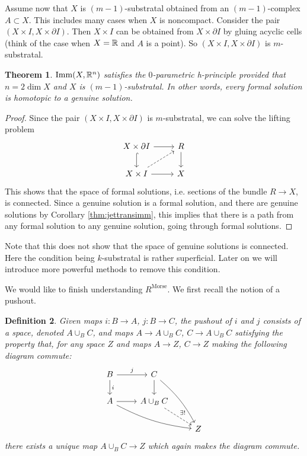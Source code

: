 \documentclass{article}
\newtheorem{theorem}{Theorem}[section]
\newtheorem{definition}[theorem]{Definition}
\newtheorem{proposed work}[theorem]{Proposed Work}
\theoremstyle{definition}
\DeclareMathOperator{\Imm}{Imm}
\DeclareMathOperator{\Morse}{Morse}
\begin{document}
Assume now that $X$ is $(m-1)$-substratal obtained from an $(m-1)$-complex $A \subset X$. This includes many cases when $X$ is noncompact. Consider the pair $(X\times I, X\times \partial I)$. Then $X\times I$ can be obtained from $X\times\partial I$ by gluing acyclic cells (think of the case when $X=\mathbb R$ and $A$ is a point). So $(X\times I, X\times \partial I)$ is $m$-substratal.

\begin{theorem}
$\Imm(X,\R^n)$ satisfies the $0$-parametric h-principle provided that $n=2\dim X$ and $X$ is $(m-1)$-substratal. In other words, every formal solution is homotopic to a genuine solution.
\end{theorem}

\begin{proof}
Since the pair $(X\times I, X\times \partial I)$ is $m$-substratal, we can solve the lifting problem
\begin{equation*}
\begin{tikzcd}
X\times\partial I \arrow[r] \arrow[hookrightarrow]{d}
& R \arrow[d]
\\
X \times I \arrow[r] \arrow[dashed,ur]
& X
\end{tikzcd}
\end{equation*}
This shows that the space of formal solutions, i.e. sections of the bundle $R \to X$, is connected.  Since a genuine solution is a formal solution, and there are genuine solutions by Corollary \ref{thm:jettransimm}, this implies that there is a path from any formal solution to any genuine solution, going through formal solutions.
\end{proof}
Note that this does not show that the space of genuine solutions is connected. Here the condition being $k$-substratal is rather superficial. Later on we will introduce more powerful methods to remove this condition.


We would like to finish understanding $R^{\Morse}$. We first recall the notion of a pushout.

\begin{definition}
Given maps $i: B \to A$, $j: B \to C$, the \emph{pushout} of $i$ and $j$ consists of a space, denoted $A \cup_B C$, and maps $A \to A\cup_B C$, $C \to A\cup_B C$ satisfying the property that, for any space $Z$ and maps $A \to Z$, $C \to Z$ making the following diagram commute:
\begin{equation*}
\begin{tikzcd}
B \arrow[r, "j"] \arrow[d,"i"] & C \arrow[d] \arrow[ddr, bend left=10] \\
A \arrow[r] \arrow[drr, bend right=10] & A \cup_B C \arrow[dashed, "\exists!", dr] \\
& & Z
\end{tikzcd}
\end{equation*}
there exists a unique map $A \cup_B C \to Z$ which again makes the diagram commute.
\end{definition}
\end{document}
